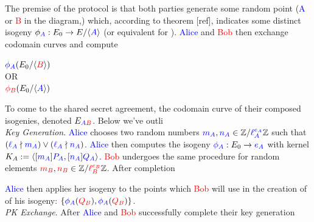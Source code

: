 \begin{center}
\end{center}

The premise of the protocol is that both parties generate some random point (\textcolor{blue}{A} or \textcolor{red}{B} in the diagram,) which, according to theorem [ref], indicates some distinct isogeny $\phi_{\textcolor{blue}{A}}: E_0 \rightarrow E/ \langle \textcolor{blue}{A} \rangle$ (or equivalent for \rb). \textcolor{blue}{Alice} and \textcolor{red}{Bob} then exchange codomain curves and compute
\begin{center}
$\textcolor{blue}{\phi_A}(E_0/\langle \textcolor{red}{B} \rangle)$\\
$\text{OR}$\\
$\textcolor{red}{\phi_B}(E_0/\langle \textcolor{blue}{A} \rangle)$
\end{center}
To come to the shared secret agreement, the codomain curve of their composed isogenies, denoted $E_{\textcolor{blue}{A}\textcolor{red}{B}}$. Below we've outli\\

\noindent
\textit{Key Generation}. \textcolor{blue}{Alice} chooses two random numbers $\textcolor{blue}{m_A}, \textcolor{blue}{n_A} \in \mathbb{Z}/\textcolor{blue}{\ell_{A}^{e_A}}\mathbb{Z}$ such that $(\textcolor{blue}{\ell_{A}} \nmid \textcolor{blue}{m_A}) \lor (\textcolor{blue}{\ell_{A}} \nmid \textcolor{blue}{n_A})$. \textcolor{blue}{Alice} then computes the isogeny $\textcolor{blue}{\phi_A}: E_0 \rightarrow \textcolor{blue}{e_A}$ with kernel $K_A := \langle [\textcolor{blue}{m_A}]\textcolor{blue}{P_A}, [\textcolor{blue}{n_A}]\textcolor{blue}{Q_A}\rangle$. \textcolor{red}{Bob} undergoes the same procedure for random elements $\textcolor{red}{m_B}, \textcolor{red}{n_B} \in \mathbb{Z}/\textcolor{red}{\ell_{B}^{e_B}}\mathbb{Z}$. After completion 

\textcolor{blue}{Alice} then applies her isogeny to the points which \textcolor{red}{Bob} will use in the creation of of his isogeny: $\{\textcolor{blue}{\phi_A}(\textcolor{red}{Q_B}),\textcolor{blue}{\phi_A}(\textcolor{red}{Q_B})\}$. \\

\noindent
\textit{PK Exchange}. After \textcolor{blue}{Alice} and \textcolor{red}{Bob} successfully complete their key generation\\


